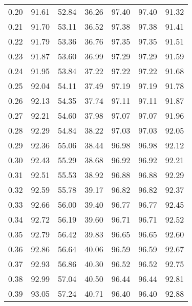 \begin{tabular}{|c|c|c|c|c|c|c|}
      0.20 &     91.61 &     52.84 &      36.26 &   97.40 &      97.40 &         91.32 \\
      0.21 &     91.70 &     53.11 &      36.52 &   97.38 &      97.38 &         91.41 \\
      0.22 &     91.79 &     53.36 &      36.76 &   97.35 &      97.35 &         91.51 \\
      0.23 &     91.87 &     53.60 &      36.99 &   97.29 &      97.29 &         91.59 \\
      0.24 &     91.95 &     53.84 &      37.22 &   97.22 &      97.22 &         91.68 \\
      0.25 &     92.04 &     54.11 &      37.49 &   97.19 &      97.19 &         91.78 \\
      0.26 &     92.13 &     54.35 &      37.74 &   97.11 &      97.11 &         91.87 \\
      0.27 &     92.21 &     54.60 &      37.98 &   97.07 &      97.07 &         91.96 \\
      0.28 &     92.29 &     54.84 &      38.22 &   97.03 &      97.03 &         92.05 \\
      0.29 &     92.36 &     55.06 &      38.44 &   96.98 &      96.98 &         92.12 \\
      0.30 &     92.43 &     55.29 &      38.68 &   96.92 &      96.92 &         92.21 \\
      0.31 &     92.51 &     55.53 &      38.92 &   96.88 &      96.88 &         92.29 \\
      0.32 &     92.59 &     55.78 &      39.17 &   96.82 &      96.82 &         92.37 \\
      0.33 &     92.66 &     56.00 &      39.40 &   96.77 &      96.77 &         92.45 \\
      0.34 &     92.72 &     56.19 &      39.60 &   96.71 &      96.71 &         92.52 \\
      0.35 &     92.79 &     56.42 &      39.83 &   96.65 &      96.65 &         92.60 \\
      0.36 &     92.86 &     56.64 &      40.06 &   96.59 &      96.59 &         92.67 \\
      0.37 &     92.93 &     56.86 &      40.30 &   96.52 &      96.52 &         92.75 \\
      0.38 &     92.99 &     57.04 &      40.50 &   96.44 &      96.44 &         92.81 \\
      0.39 &     93.05 &     57.24 &      40.71 &   96.40 &      96.40 &         92.88 \\

\end{tabular}
